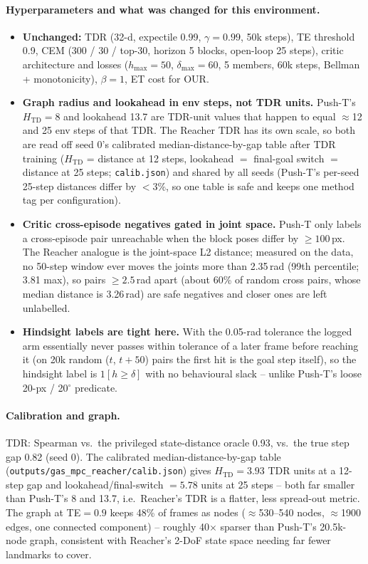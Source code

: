 \documentclass[11pt]{article}
\newcommand{\Htd}{H_{\mathrm{TD}}}
\begin{document}
\paragraph{Hyperparameters and what was changed for this environment.}
\begin{itemize}[nosep]
  \item \textbf{Unchanged:} TDR (32-d, expectile 0.99, $\gamma=0.99$, 50k steps), TE
        threshold 0.9, CEM (300 / 30 / top-30, horizon 5 blocks, open-loop 25 steps), critic
        architecture and losses ($h_{\max}=50$, $\delta_{\max}=60$, 5 members, 60k steps,
        Bellman + monotonicity), $\beta=1$, ET cost for OUR.
  \item \textbf{Graph radius and lookahead in env steps, not TDR units.} Push-T's $\Htd=8$ and
        lookahead 13.7 are TDR-unit values that happen to equal $\approx$12 and 25 env steps of
        that TDR. The Reacher TDR has its own scale, so both are read off seed 0's calibrated
        median-distance-by-gap table after TDR training ($\Htd$ = distance at 12 steps,
        lookahead $=$ final-goal switch $=$ distance at 25 steps; \texttt{calib.json}) and
        shared by all seeds (Push-T's per-seed 25-step distances differ by $<3\%$, so one
        table is safe and keeps one method tag per configuration).
  \item \textbf{Critic cross-episode negatives gated in joint space.} Push-T only labels a
        cross-episode pair unreachable when the block poses differ by $\ge 100$\,px. The
        Reacher analogue is the joint-space L2 distance; measured on the data, no 50-step
        window ever moves the joints more than 2.35\,rad (99th percentile; 3.81 max), so
        pairs $\ge 2.5$\,rad apart (about 60\% of random cross pairs, whose median distance is
        3.26\,rad) are safe negatives and closer ones are left unlabelled.
  \item \textbf{Hindsight labels are tight here.} With the 0.05-rad tolerance the logged arm
        essentially never passes within tolerance of a later frame before reaching it (on
        20k random ($t$, $t{+}50$) pairs the first hit is the goal step itself), so the
        hindsight label is $1[h \ge \delta]$ with no behavioural slack -- unlike Push-T's
        loose 20-px / 20$^\circ$ predicate.
\end{itemize}

\paragraph{Calibration and graph.} TDR: Spearman vs.\ the privileged state-distance oracle
0.93, vs.\ the true step gap 0.82 (seed 0). The calibrated median-distance-by-gap table
(\texttt{outputs/gas\_mpc\_reacher/calib.json}) gives $H_{\mathrm{TD}}=3.93$ TDR units at a
12-step gap and lookahead/final-switch $=5.78$ units at 25 steps -- both far smaller than
Push-T's 8 and 13.7, i.e.\ Reacher's TDR is a flatter, less spread-out metric. The graph at
TE$=0.9$ keeps 48\% of frames as nodes ($\approx$530--540 nodes, $\approx$1900 edges, one
connected component) -- roughly 40$\times$ sparser than Push-T's 20.5k-node graph, consistent
with Reacher's 2-DoF state space needing far fewer landmarks to cover.
\end{document}
